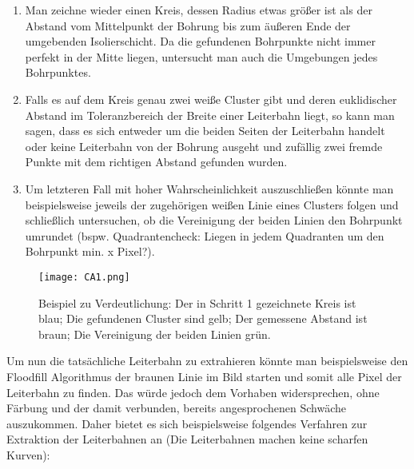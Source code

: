 \begin{enumerate}
\item Man zeichne wieder einen Kreis, dessen Radius etwas größer ist als der Abstand vom Mittelpunkt der Bohrung bis zum äußeren Ende der umgebenden Isolierschicht. \newline
Da die gefundenen Bohrpunkte nicht immer perfekt in der Mitte liegen, untersucht man auch die Umgebungen jedes Bohrpunktes.
\item Falls es auf dem Kreis genau zwei weiße Cluster gibt und deren euklidischer Abstand im Toleranzbereich der Breite einer Leiterbahn liegt, so kann man sagen, dass es sich entweder um die beiden Seiten der Leiterbahn handelt oder keine Leiterbahn von der Bohrung ausgeht und zufällig zwei fremde Punkte mit dem richtigen Abstand gefunden wurden.
\item Um letzteren Fall mit hoher Wahrscheinlichkeit auszuschließen könnte man beispielsweise jeweils der zugehörigen weißen Linie eines Clusters folgen und schließlich untersuchen, ob die Vereinigung der beiden Linien den Bohrpunkt umrundet (bspw. Quadrantencheck: Liegen in jedem Quadranten um den Bohrpunkt min. x Pixel?).
\end{enumerate}

\begin{figure}[H]
  \begin{center}
    \texttt{[image: CA1.png]}
    \caption{Beispiel zu Verdeutlichung: Der in Schritt 1 gezeichnete Kreis ist blau; Die gefundenen Cluster sind gelb; Der gemessene Abstand ist braun; Die Vereinigung der beiden Linien grün.}
    \label{fig:l_alg_1}
  \end{center}
\end{figure}

Um nun die tatsächliche Leiterbahn zu extrahieren könnte man beispielsweise den Floodfill Algorithmus der braunen Linie im Bild starten und somit alle Pixel der Leiterbahn zu finden. Das würde jedoch dem Vorhaben widersprechen, ohne Färbung und der damit verbunden, bereits angesprochenen Schwäche auszukommen. \newline
Daher bietet es sich beispielsweise folgendes Verfahren zur Extraktion der Leiterbahnen an (Die Leiterbahnen machen keine scharfen Kurven): \newline

